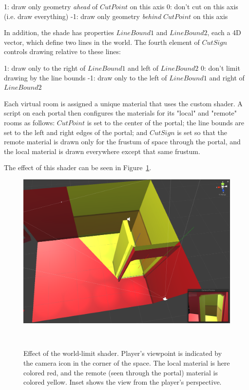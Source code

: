 \documentclass{sigchi}
\begin{document}
1: draw only geometry \textit{ahead} of $CutPoint$ on this axis
0: don't cut on this axis (i.e. draw everything)
-1: draw only geometry \textit{behind} $CutPoint$ on this axis

In addition, the shade has properties $LineBound1$ and $LineBound2$, each a 4D vector, which define two lines in the world.  The fourth element of $CutSign$ controls drawing relative to these lines:

1: draw only to the right of $LineBound1$ and left of $LineBound2$
0: don't limit drawing by the line bounds
-1: draw only to the left of $LineBound1$ and right of $LineBound2$

Each virtual room is assigned a unique material that uses the custom shader.  A script on each portal then configures the materials for its "local" and "remote" rooms as follows: $CutPoint$ is set to the center of the portal; the line bounds are set to the left and right edges of the portal; and $CutSign$ is set so that the remote material is drawn only for the frustum of space through the portal, and the local material is drawn everywhere except that same frustum.

The effect of this shader can be seen in Figure~\ref{fig:shaderEffect}.

\begin{figure}[htb]
  \centering
  \includegraphics[width=1\columnwidth]{figures/ShaderEffect.png}
  \caption{Effect of the world-limit shader.  Player's viewpoint is indicated by the camera icon in the corner of the space.  The local material is here colored red, and the remote (seen through the portal) material is colored yellow.  Inset shows the view from the player's perspective.}~\label{fig:shaderEffect}
\end{figure}
\end{document}

